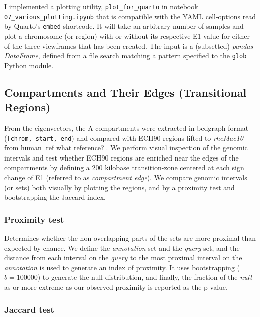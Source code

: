 \documentclass[
  11pt,
  a4paper,
]{scrbook}
\let\oldemph\emph
\renewcommand\emph[1]{\oldemph{\color{gray}#1}}
\begin{document}
I implemented a plotting utility, \texttt{plot\_for\_quarto} in notebook
\texttt{07\_various\_plotting.ipynb} that is compatible with the YAML
cell-options read by Quarto's \texttt{embed} shortcode. It will take an
arbitrary number of samples and plot a chromosome (or region) with or
without its respective E1 value for either of the three viewframes that
has been created. The input is a (subsetted) \emph{pandas DataFrame},
defined from a file search matching a pattern specified to the
\texttt{glob} Python module.

\subsection{Compartments and Their Edges (Transitional
Regions)}\label{compartments-and-their-edges-transitional-regions}

From the eigenvectors, the A-compartments were extracted in
bedgraph-format
(\texttt{{[}\textquotesingle{}chrom\textquotesingle{},\ \textquotesingle{}start\textquotesingle{},\ \textquotesingle{}end\textquotesingle{}{]}})
and compared with ECH90 regions lifted to \emph{rheMac10} from human
{[}ref what reference?{]}. We perform visual inspection of the genomic
intervals and test whether ECH90 regions are enriched near the edges of
the compartments by defining a 200 kilobase transition-zone centered at
each sign change of E1 (referred to as \emph{compartment edge}). We
compare genomic intervals (or sets) both visually by plotting the
regions, and by a proximity test and bootstrapping the Jaccard index.

\subsubsection{Proximity test}\label{proximity-test}

Determines whether the non-overlapping parts of the sets are more
proximal than expected by chance. We define the \emph{annotation} set
and the \emph{query} set, and the distance from each interval on the
\emph{query} to the most proximal interval on the \emph{annotation} is
used to generate an index of proximity. It uses bootstrapping
(\(b = 100000\)) to generate the null distribution, and finally, the
fraction of the \emph{null} as or more extreme as our observed proximity
is reported as the p-value.

\subsubsection{Jaccard test}\label{jaccard-test}
\end{document}
